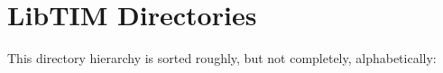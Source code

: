\section{Lib\-TIM Directories}
This directory hierarchy is sorted roughly, but not completely, alphabetically:\begin{CompactList}
\item {}
\item {}
\end{CompactList}
